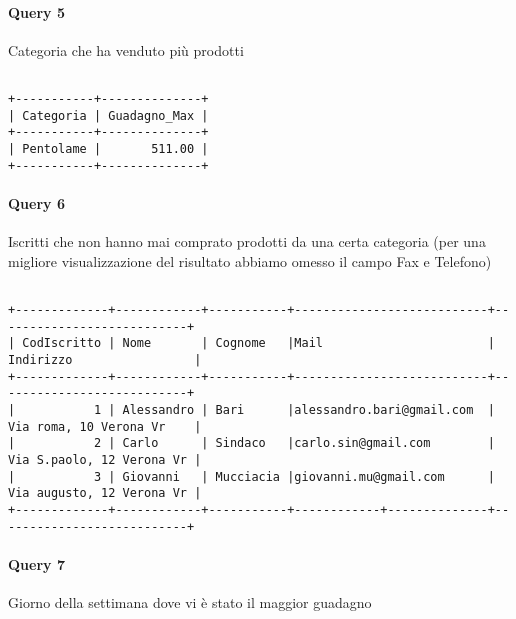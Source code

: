 

\paragraph*{Query 5}
Categoria che ha venduto pi\`u prodotti

\begin{verbatim}

+-----------+--------------+
| Categoria | Guadagno_Max |
+-----------+--------------+
| Pentolame |       511.00 |
+-----------+--------------+

\end{verbatim}



\paragraph*{Query 6}
Iscritti che non hanno mai comprato prodotti da una certa categoria (per una migliore visualizzazione del risultato abbiamo omesso il campo Fax e Telefono) 

\begin{verbatim}

+-------------+------------+-----------+---------------------------+---------------------------+
| CodIscritto | Nome       | Cognome   |Mail                       | Indirizzo                 |
+-------------+------------+-----------+---------------------------+---------------------------+
|           1 | Alessandro | Bari      |alessandro.bari@gmail.com  | Via roma, 10 Verona Vr    |
|           2 | Carlo      | Sindaco   |carlo.sin@gmail.com        | Via S.paolo, 12 Verona Vr |
|           3 | Giovanni   | Mucciacia |giovanni.mu@gmail.com      | Via augusto, 12 Verona Vr |
+-------------+------------+-----------+------------+--------------+---------------------------+

\end{verbatim}



\newpage
\paragraph*{Query 7}
Giorno della settimana dove vi \`e stato il maggior guadagno


